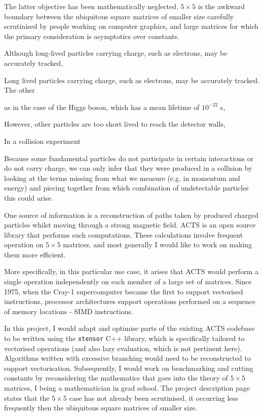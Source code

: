 \documentclass[12pt]{amsart}
\begin{document}
The latter objective has been mathematically neglected. $5 \times 5$ is the awkward boundary between the ubiquitous square matrices of smaller size carefully scrutinised by people working on computer graphics, and large matrices for which the primary consideration is asymptotics over constants.

\iffalse
\clearpage

Although long-lived particles carrying charge, such as electrons, may be accurately tracked,

Long lived particles carrying charge, such as electrons, may be accurately tracked.
The other

as in the case of the Higgs boson, which has a mean lifetime of $10^{-22}$ s,

However, other particles are too short lived to reach the detector walls,

In a collision experiment

Because some fundamental particles do not participate in certain interactions or do not carry charge, we can only infer that they were produced in a collision by looking at the terms missing from what we measure (e.g. in momentum and energy) and piecing together from which combination of undetectable particles this could arise.

One source of information is a reconstruction of paths taken by produced charged particles whilst moving through a strong magnetic field. ACTS is an open source library that performs such computations. These calculations involve frequent operation on $5 \times 5$ matrices, and most generally I would like to work on making them more efficient.

More specifically, in this particular use case, it arises that ACTS would perform a single operation independently on each member of a large set of matrices. Since 1975, when the Cray-1 supercomputer became the first to support vectorised instructions, processor architectures support operations performed on a sequence of memory locations - SIMD instructions.

In this project, I would adapt and optimise parts of the existing ACTS codebase to be written using the \texttt{xtensor} C++ library, which is specifically tailored to vectorised operations (and also lazy evaluation, which is not pertinent here). Algorithms written with excessive branching would need to be reconstructed to support vectorisation. Subsequently, I would work on benchmarking and cutting constants by reconsidering the mathematics that goes into the theory of $5 \times 5$ matrices, I being a mathematician in grad school. The project description page states that the $5 \times 5$ case has not already been scrutinised, it occurring less frequently then the ubiquitous square matrices of smaller size.
\end{document}
